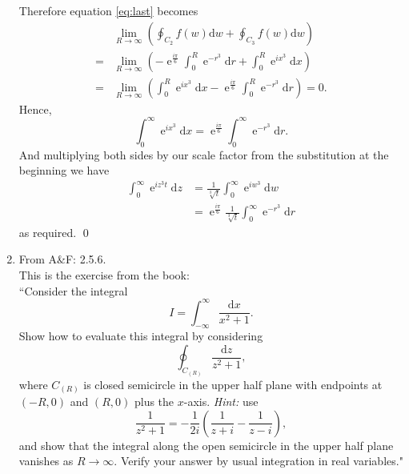 \documentclass[10pt]{amsart}
\newcommand{\D}{\mathrm{d}}
\DeclareMathOperator{\E}{e}
\theoremstyle{nonumberplain}
\begin{document}
\begin{enumerate}[label={\bf {\arabic*}:}]
Therefore equation \eqref{eq:last} becomes
\begin{align*}
& \lim_{R\rightarrow\infty} \left(
	\oint_{C_{2}} f(w) \D w + \oint_{C_{3}} f(w) \D w
\right) \\
	= & \lim_{R\rightarrow\infty}  \left(
	- \E^{\frac{i\pi}{6}} \int_{0}^{R} \E^{-r^3} \D r + \int_{0}^{R} \E^{ix^3} \D x
\right) \\
= & \lim_{R\rightarrow\infty}  \left(
	\int_{0}^{R} \E^{ix^3} \D x
	- \E^{\frac{i\pi}{6}} \int_{0}^{R} \E^{-r^3} \D r 
\right) = 0.
\end{align*}
Hence,
$$
\int_{0}^{\infty} \E^{ix^3} \D x =  \E^{\frac{i\pi}{6}} \int_{0}^{\infty} \E^{-r^3} \D r.
$$
And multiplying both sides by our scale factor from the substitution at the beginning we have
\begin{align*}
\int_{0}^{\infty} \E^{iz^3t} \D z &= \frac{1} {\sqrt[3]{t}} \int_{0}^{\infty} \E^{iw^3} \D w \\
	&=  \E^{\frac{i\pi}{6}} \frac{1} {\sqrt[3]{t}}  \int_{0}^{\infty} \E^{-r^3} \D r
\end{align*}
as required.
\qed
\\

\item From A\&F: 2.5.6. \\
This is the exercise from the book: \\
``Consider the integral $$I = \int_{-\infty}^{\infty} \frac{\D x}{x^2 + 1}.$$
Show how to evaluate this integral by considering
$$\oint_{C_{(R)}} \frac{\D z}{z^2 + 1},$$
where $C_{(R)}$ is closed semicircle in the upper half plane with endpoints at $(-R, 0)$ and $(R, 0)$ plus the $x$-axis.
\textit{Hint:} use
$$\frac{1}{z^2 + 1} = -\frac{1}{2i}\left(\frac{1}{z + i} - \frac{1}{z - i}\right),$$
and show that the integral along the open semicircle in the upper half plane vanishes as $R \rightarrow \infty$.
Verify your answer by usual integration in real variables." \\


\end{enumerate}
\end{document}
